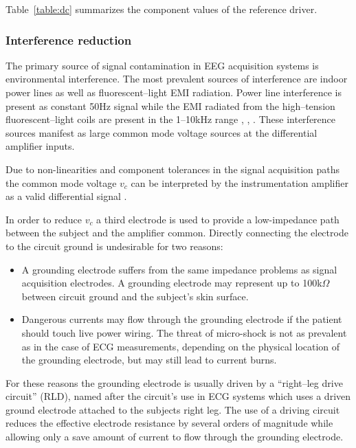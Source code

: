 Table~\ref{table:dc} summarizes the component values of the reference
driver.

\subsubsection{Interference reduction}
The primary source of signal contamination in EEG acquisition systems
is environmental interference. The most prevalent sources of
interference are indoor power lines as well as fluorescent--light EMI
radiation. Power line interference is present as constant 50Hz signal
while the EMI radiated from the high--tension fluorescent--light coils
are present in the 1--10kHz range \cite{drive},
\cite{fluorescent-interference},
\cite{fluorescent-interference2}. These interference sources manifest
as large common mode voltage sources at the differential amplifier
inputs.

Due to non-linearities and component tolerances in the signal
acquisition paths the common mode voltage $v_c$ can be interpreted by
the instrumentation amplifier as a valid differential signal
\cite{drive}. 

In order to reduce $v_c$ a third electrode is used to provide a
low-impedance path between the subject and the amplifier
common. Directly connecting the electrode to the circuit ground is
undesirable for two reasons:
\begin{itemize}
	\item{A grounding electrode suffers from the same impedance
	problems as signal acquisition electrodes. A grounding electrode
	may represent up to 100k$\Omega$ between circuit ground and the
	subject's skin surface.}

	\item{Dangerous currents may flow through the grounding electrode
	if the patient should touch live power wiring. The threat of
	micro-shock is not as prevalent as in the case of ECG
	measurements, depending on the physical location of the grounding
	electrode, but may still lead to current burns.}
\end{itemize}

For these reasons the grounding electrode is usually driven by a
``right--leg drive circuit'' (RLD), named after the circuit's use in
ECG systems which uses a driven ground electrode attached to the
subjects right leg. The use of a driving circuit reduces the effective
electrode resistance by several orders of magnitude while allowing
only a save amount of current to flow through the grounding electrode.


